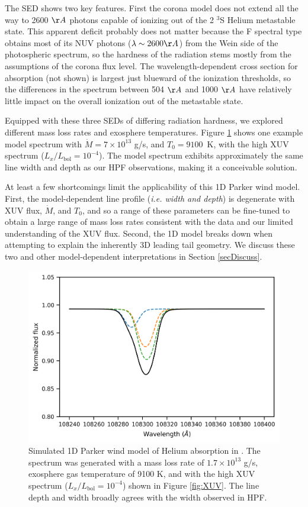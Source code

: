 \documentclass[twocolumn]{aastex631}
\newcommand{\hatpb}{\object{HAT-P-67 b}}
\begin{document}
The SED shows two key features.   First the corona model does not extend all the way to 2600 $\AA$ photons capable of ionizing out of the 2 $^3$S Helium metastable state.  This apparent deficit probably does not matter because the F spectral type obtains most of its NUV photons ($\lambda\sim2600\AA$) from the Wein side of the photospheric spectrum, so the hardness of the radiation stems mostly from the assumptions of the corona flux level.  The wavelength-dependent cross section for absorption (not shown) is largest just blueward of the ionization thresholds, so the differences in the spectrum between 504 $\AA$ and 1000 $\AA$ have relatively little impact on the overall ionization out of the metastable state.

Equipped with these three SEDs of differing radiation hardness, we explored different mass loss rates and exosphere temperatures.  Figure \ref{fig:pwinds} shows one example model spectrum with $\dot{M} = 7\times10^{13}$ g/s, and $T_0=9100$~K, with the high XUV spectrum ($L_x/L_\mathrm{bol}=10^{-4}$).  The model spectrum exhibits approximately the same line width and depth as our HPF observations, making it a conceivable solution.

At least a few shortcomings limit the applicability of this 1D Parker wind model.  First, the model-dependent line profile (\emph{i.e. width and depth}) is degenerate with XUV flux, $\dot{M}$, and $T_0$, and so a range of these parameters can be fine-tuned to obtain a large range of mass loss rates consistent with the data and our limited understanding of the XUV flux.  Second, the 1D model breaks down when attempting to explain the inherently 3D leading tail geometry.  We discuss these two and other model-dependent interpretations in Section \ref{secDiscuss}.




\begin{figure}
    \includegraphics[width=\linewidth]{figures/pwinds_1D_higXUV_t1p2Gyr.png}
    \caption{Simulated 1D Parker wind model of Helium absorption in \hatpb.  The spectrum was generated with a mass loss rate of $1.7\times10^{13}$ g/s, exosphere gas temperature of 9100 K, and with the high XUV spectrum ($L_x/L_\mathrm{bol}=10^{-4}$) shown in Figure \ref{fig:XUV}.  The line depth and width broadly agrees with the width observed in HPF.}
    \label{fig:pwinds}
\end{figure}
\end{document}
